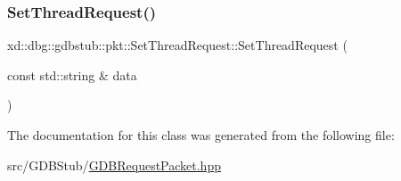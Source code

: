 \subsubsection{\texorpdfstring{Set\+Thread\+Request()}{SetThreadRequest()}}
{\footnotesize\ttfamily xd\+::dbg\+::gdbstub\+::pkt\+::\+Set\+Thread\+Request\+::\+Set\+Thread\+Request (\begin{DoxyParamCaption}\item[{const std\+::string \&}]{data }\end{DoxyParamCaption})\hspace{0.3cm}{\ttfamily [inline]}}



The documentation for this class was generated from the following file\+:\begin{DoxyCompactItemize}
\item 
src/\+G\+D\+B\+Stub/\mbox{\hyperlink{_g_d_b_request_packet_8hpp}{G\+D\+B\+Request\+Packet.\+hpp}}\end{DoxyCompactItemize}
